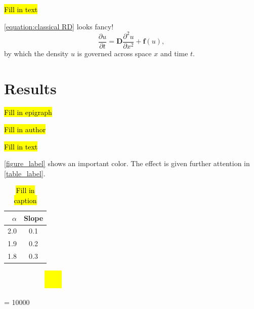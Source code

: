 \documentclass[oneside]{book}
\begin{document}
\hl{Fill in text}

\autoref{equation:classical RD} looks fancy!
\begin{equation}
\label{equation:classical RD}
\dfrac{\partial u}{\partial t} = \mathbf{D}\dfrac{\partial ^2 u}{\partial x^2} + \mathbf{f}(u),
\end{equation}
by which the density $u$ is governed across space $x$ and time $t$.

\chaptercloser

\chapter{Results}
\label{chap:results}

\label{chap:introduction}
\epigraph{\hl{Fill in epigraph}}{\hl{Fill in author}}

\hl{Fill in text}

\autoref{figure_label} shows an important color.
The effect is given further attention in \autoref{table_label}.

\begin{table}
\centering
\caption{\hl{Fill in caption}}
\bgroup
\def\arraystretch{1.5}
\begin{tabular}{r|c}
$\alpha$	& Slope	\\
\hline
2.0 & 0.1 \\
1.9 & 0.2 \\
1.8 & 0.3 \\
\end{tabular}
\egroup
\label{table_label}
\end{table}

\begin{figure}
\centering
\caption{
\hl{Fill in caption}
}
\begin{subfigure}{1.0\textwidth}
\centering
\includegraphics[clip, trim = 0.5cm 0.5cm 0.5cm 0.5cm, width = 0.1\textwidth]{image.png}
\end{subfigure}
\label{figure_label}
\end{figure}

\clearpage
\interlinepenalty = 10000 %



\clearpage
{}

\end{document}
